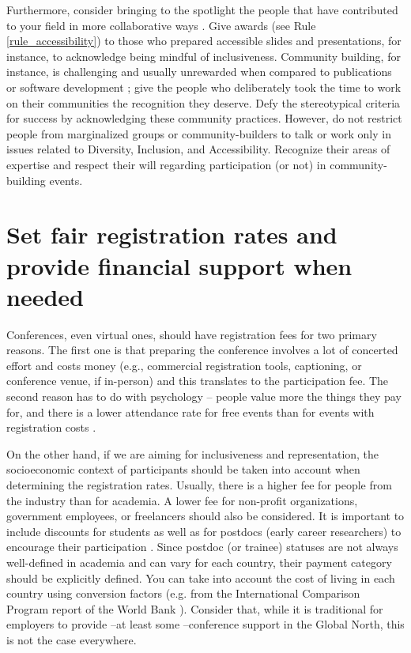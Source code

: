 \documentclass[10pt,letterpaper]{article}
\begin{document}
Furthermore, consider bringing to the spotlight the people that have contributed to your field in more collaborative  ways \cite{cheng2020x+}. Give awards (see Rule \ref{rule_accessibility}) to those who prepared accessible slides and presentations, for instance, to acknowledge being mindful of inclusiveness. Community building, for instance, is challenging and usually unrewarded when compared to publications or software development \cite{acionWhyChooseCommunity2020}; give the people who deliberately took the time to work on their communities the recognition they deserve. Defy the stereotypical criteria for success by acknowledging these community practices. 
However, do not restrict people from marginalized groups or community-builders to talk or work only in issues related to Diversity, Inclusion, and Accessibility. Recognize their areas of expertise and respect their will regarding participation (or not) in community-building events.


\section{Set fair registration rates and provide financial support when needed}
\label{rule_costs}

Conferences, even virtual ones, should have registration fees for two primary reasons. The first one is that preparing the conference involves a lot of concerted effort and costs money (e.g., commercial registration tools, captioning, or conference venue, if in-person) and this translates to the participation fee. The second reason has to do with psychology -- people value more the things they pay for, and there is a lower attendance rate for free events than for events with registration costs \cite{eventbrite_ultimate_2017}. 

On the other hand, if we are aiming for inclusiveness and representation, the socioeconomic context of participants should be taken into account when determining the registration rates. Usually, there is a higher fee for people from the industry than for academia. A lower fee for non-profit organizations, government employees, or freelancers should also be considered. It is important to include discounts for students as well as for postdocs (early career researchers) to encourage their participation \cite{sarabipourChangingScientificMeetings2021, andalibPostdocQueueLabour2018, kaplanPostdocNot2012}. Since postdoc (or trainee) statuses are not always well-defined in academia and can vary for each country, their payment category should be explicitly defined. You can take into account the cost of living in each country using conversion factors (e.g. from the International Comparison Program report of the World Bank \cite{arendDisparityConferenceRegistration2019}). Consider that, while it is traditional for employers to provide --at least some --conference support in the Global North, this is not the case everywhere. 
\end{document}

